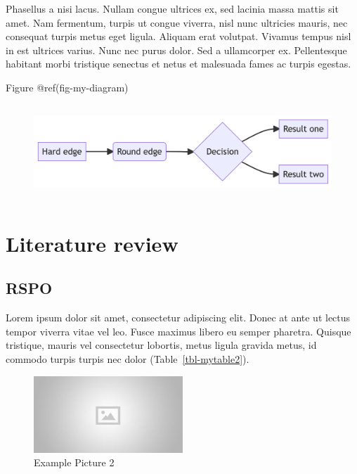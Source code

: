 \documentclass[
]{article}
\begin{document}
Phasellus a nisi lacus. Nullam congue ultrices ex, sed lacinia massa
mattis sit amet. Nam fermentum, turpis ut congue viverra, nisl nunc
ultricies mauris, nec consequat turpis metus eget ligula. Aliquam erat
volutpat. Vivamus tempus nisl in est ultrices varius. Nunc nec purus
dolor. Sed a ullamcorper ex. Pellentesque habitant morbi tristique
senectus et netus et malesuada fames ac turpis egestas.

Figure @ref(fig-my-diagram)

\begin{figure}[H]

{\centering \includegraphics[width=5.74in,height=1.4in]{Main_files/figure-latex/mermaid-figure-1.png}

}

\end{figure}

\hypertarget{literature-review}{%
\section{Literature review}\label{literature-review}}

\hypertarget{rspo}{%
\subsection{RSPO}\label{rspo}}

Lorem ipsum dolor sit amet, consectetur adipiscing elit. Donec at ante
ut lectus tempor viverra vitae vel leo. Fusce maximus libero eu semper
pharetra. Quisque tristique, mauris vel consectetur lobortis, metus
ligula gravida metus, id commodo turpis turpis nec dolor
(Table~\ref{tbl-mytable2}).

\begin{figure}

{\centering \includegraphics[width=0.5\textwidth,height=\textheight]{placeholder.jpg}

}

\caption{Example Picture 2}

\end{figure}
\end{document}
